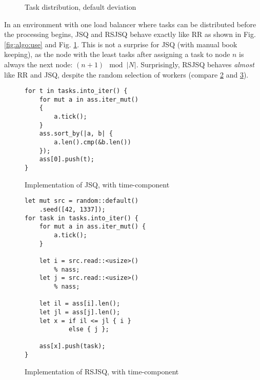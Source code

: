 \begin{figure}[b!]
        \centering
        \caption{Task distribution, default deviation}
        \label{fig:algo:use:defdev}
\end{figure}

In an environment with one load balancer where tasks can be distributed before
the processing begins, \ac{JSQ} and \ac{RSJSQ} behave exactly like \ac{RR} as
shown in Fig. \ref{fig:algo:use} and Fig. \ref{fig:algo:use:defdev}.
This is not a surprise for \ac{JSQ} (with manual book keeping), as the node with
the least tasks after assigning a task to node $n$ is always the next node:
$(n + 1) \mod |N|$.
Surprisingly, \ac{RSJSQ} behaves \emph{almost} like \ac{RR} and \ac{JSQ},
despite the random selection of workers
(compare \ref{lst:jsq} and \ref{lst:rsjsq}).

\begin{figure}[]
	\begin{verbatim}
for t in tasks.into_iter() {
    for mut a in ass.iter_mut()
    {
        a.tick();
    }
    ass.sort_by(|a, b| {
        a.len().cmp(&b.len())
    });
    ass[0].push(t);
}
	\end{verbatim}
    \caption{Implementation of \ac{JSQ}, with time-component}
    \label{lst:jsq}
\end{figure}

\begin{figure}[b!]
	\begin{verbatim}
let mut src = random::default()
    .seed([42, 1337]);
for task in tasks.into_iter() {
    for mut a in ass.iter_mut() {
        a.tick();
    }

    let i = src.read::<usize>()
        % nass;
    let j = src.read::<usize>()
        % nass;

    let il = ass[i].len();
    let jl = ass[j].len();
    let x = if il <= jl { i }
            else { j };

    ass[x].push(task);
}
	\end{verbatim}
    \caption{Implementation of \ac{RSJSQ}, with time-component}
    \label{lst:rsjsq}
\end{figure}

